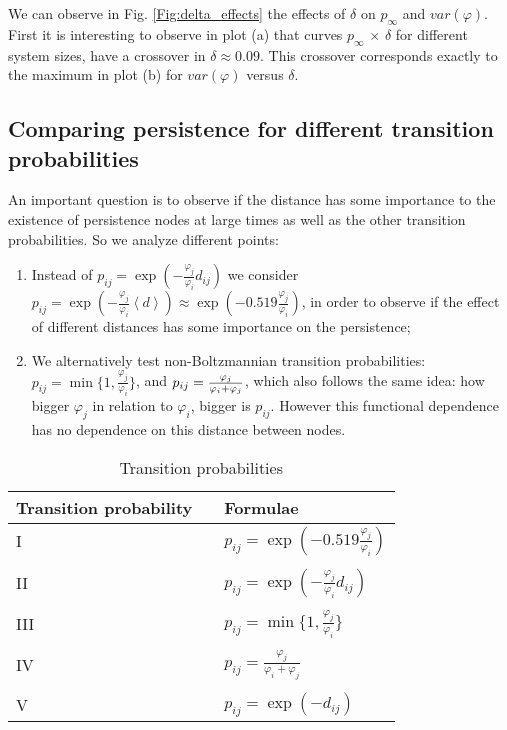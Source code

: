 \documentclass[3p, 11pt]{elsarticle}
\begin{document}
We can observe in Fig. \ref{Fig:delta_effects} the effects of $\delta $ on $%
p_{\infty }$ and $var(\varphi )$. First it is interesting to observe in plot
(a) that curves $p_{\infty }$ $\times $ $\delta $ for different system
sizes, have a crossover in $\delta \approx 0.09$. This crossover corresponds
exactly to the maximum in plot (b) for $var(\varphi )$ versus $\delta $.

\subsection{Comparing persistence for different transition probabilities}

An important question is to observe if the distance has some importance to
the existence of persistence nodes at large times as well as the other
transition probabilities. So we analyze different points:

\begin{enumerate}
\item Instead of $p_{ij}=\exp (-\frac{\varphi _{j}}{\varphi _{i}}d_{ij})$ we
consider $p_{ij}=\exp (-\frac{\varphi _{j}}{\varphi _{i}}\left\langle
d\right\rangle )\approx \exp (-0.519\frac{\varphi _{j}}{\varphi _{i}})$, in
order to observe if the effect of different distances has some importance on
the persistence;

\item We alternatively test non-Boltzmannian transition probabilities: $%
p_{ij}=\min \{1,\frac{\varphi _{j}}{\varphi _{i}}\}$, and $p_{ij}=\frac{%
\varphi _{j}}{\varphi _{i}+\varphi _{j}}$, which also follows the same idea:
how bigger $\varphi _{j}$ in relation to $\varphi _{i}$, bigger is $p_{ij}$.
However this functional dependence has no dependence on this distance
between nodes.
\end{enumerate}

\begin{table}[tbp] \centering%
\begin{tabular}{l|ll}
\hline\hline
\textbf{Transition probability} &  & \textbf{Formulae} \\ \hline\hline
I &  & $p_{ij}=\exp (-0.519\frac{\varphi _{j}}{\varphi _{i}})$ \\ 
&  &  \\ 
II &  & $p_{ij}=\exp (-\frac{\varphi _{j}}{\varphi _{i}}d_{ij})$ \\ 
&  &  \\ 
III &  & $p_{ij}=\min \{1,\frac{\varphi _{j}}{\varphi _{i}}\}$ \\ 
&  &  \\ 
IV &  & $p_{ij}=\frac{\varphi _{j}}{\varphi _{i}+\varphi _{j}}$ \\ 
&  &  \\ 
V &  & $p_{ij}=\exp (-d_{ij})$ \\ \hline\hline
\end{tabular}%
\caption{Transition probabilities}\label{Table:Transition_probabilities}%
\end{table}%
\end{document}
